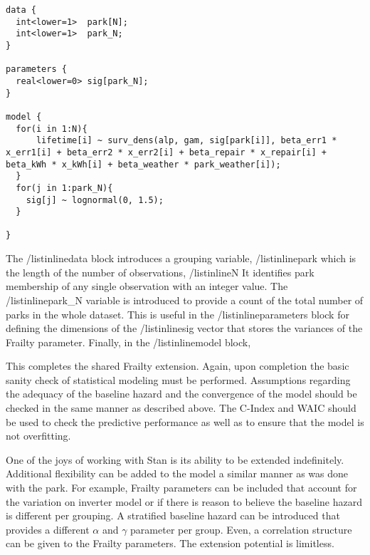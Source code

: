 \begin{lstlisting}
data {
  int<lower=1>  park[N];
  int<lower=1>  park_N;
}

parameters {
  real<lower=0> sig[park_N];
}

model {
  for(i in 1:N){
      lifetime[i] ~ surv_dens(alp, gam, sig[park[i]], beta_err1 * x_err1[i] + beta_err2 * x_err2[i] + beta_repair * x_repair[i] + beta_kWh * x_kWh[i] + beta_weather * park_weather[i]);
  }
  for(j in 1:park_N){
    sig[j] ~ lognormal(0, 1.5);
  }

}
\end{lstlisting}


The /listinline{data{}} block introduces a grouping variable, /listinline{park} which is the length of the number of observations, /listinline{N} It identifies  park membership of any single observation with an integer value. The /listinline{park_N} variable is introduced to provide a count of the total number of parks in the whole dataset. This is useful in the /listinline{parameters{}} block for defining the dimensions of the /listinline{sig} vector that stores the variances of the Frailty parameter. Finally, in the /listinline{model{}} block, 

This completes the shared Frailty extension. Again, upon completion the basic sanity check of statistical modeling must be performed. Assumptions regarding the adequacy of the baseline hazard and the convergence of the model should be checked in the same manner as described above. The C-Index and WAIC should be used to check the predictive performance as well as to ensure that the model is not overfitting. 

One of the joys of working with Stan is its ability to be extended indefinitely. Additional flexibility can be added to the model a similar manner as was done with the park. For example, Frailty parameters can be included that account for the variation on inverter model or if there is reason to believe the baseline hazard is different per grouping. A stratified baseline hazard can be introduced that provides a different $\alpha$ and $\gamma$ parameter per group. Even, a correlation structure can be given to the Frailty parameters. The extension potential is limitless. 












